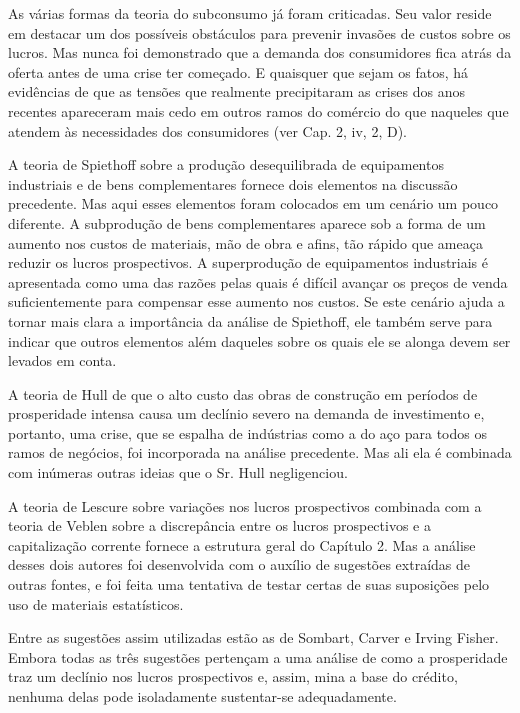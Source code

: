 \documentclass[12pt]{article}
\begin{document}
As várias formas da teoria do subconsumo já foram criticadas. Seu valor reside em destacar um dos possíveis obstáculos para prevenir invasões de custos sobre os lucros. Mas nunca foi demonstrado que a demanda dos consumidores fica atrás da oferta antes de uma crise ter começado. E quaisquer que sejam os fatos, há evidências de que as tensões que realmente precipitaram as crises dos anos recentes apareceram mais cedo em outros ramos do comércio do que naqueles que atendem às necessidades dos consumidores (ver Cap. 2, iv, 2, D).

A teoria de Spiethoff sobre a produção desequilibrada de equipamentos industriais e de bens complementares fornece dois elementos na discussão precedente. Mas aqui esses elementos foram colocados em um cenário um pouco diferente. A subprodução de bens complementares aparece sob a forma de um aumento nos custos de materiais, mão de obra e afins, tão rápido que ameaça reduzir os lucros prospectivos. A superprodução de equipamentos industriais é apresentada como uma das razões pelas quais é difícil avançar os preços de venda suficientemente para compensar esse aumento nos custos. Se este cenário ajuda a tornar mais clara a importância da análise de Spiethoff, ele também serve para indicar que outros elementos além daqueles sobre os quais ele se alonga devem ser levados em conta.

A teoria de Hull de que o alto custo das obras de construção em períodos de prosperidade intensa causa um declínio severo na demanda de investimento e, portanto, uma crise, que se espalha de indústrias como a do aço para todos os ramos de negócios, foi incorporada na análise precedente. Mas ali ela é combinada com inúmeras outras ideias que o Sr. Hull negligenciou.

A teoria de Lescure sobre variações nos lucros prospectivos combinada com a teoria de Veblen sobre a discrepância entre os lucros prospectivos e a capitalização corrente fornece a estrutura geral do Capítulo 2. Mas a análise desses dois autores foi desenvolvida com o auxílio de sugestões extraídas de outras fontes, e foi feita uma tentativa de testar certas de suas suposições pelo uso de materiais estatísticos.

Entre as sugestões assim utilizadas estão as de Sombart, Carver e Irving Fisher. Embora todas as três sugestões pertençam a uma análise de como a prosperidade traz um declínio nos lucros prospectivos e, assim, mina a base do crédito, nenhuma delas pode isoladamente sustentar-se adequadamente.
\end{document}
